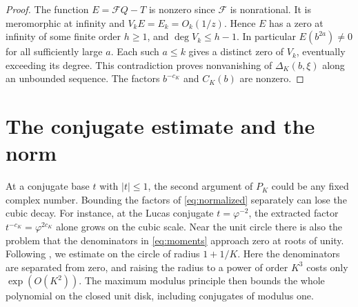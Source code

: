 \documentclass[11pt,letterpaper]{article}
\newcommand{\FF}{\mathcal F}
\begin{document}
\begin{proof}
The function \(E=\FF Q-T\) is nonzero since \(\FF\) is nonrational.
It is meromorphic at infinity and \(V_k E=E_k=O_k(1/z)\). Hence \(E\)
has a zero at infinity of some finite order \(h\ge1\), and
\(\deg V_k\le h-1\). In particular \(E(b^{2a})\ne0\) for all
sufficiently large \(a\). Each such \(a\le k\) gives a distinct zero
of \(V_k\), eventually exceeding its degree. This contradiction proves
nonvanishing of \(\Delta_K(b,\xi)\) along an unbounded sequence.
The factors \(b^{-c_K}\) and \(C_K(b)\) are nonzero.
\end{proof}

\newpage
\section{The conjugate estimate and the norm}\label{sec:norm}
At a conjugate base \(t\) with \(|t|\le1\), the second argument of
\(P_K\) could be any fixed complex number. Bounding the factors of
\eqref{eq:normalized} separately can lose the cubic decay. For instance,
at the Lucas conjugate \(t=\varphi^{-2}\), the extracted factor
\(t^{-c_K}=\varphi^{2c_K}\) alone grows on the cubic scale.
Near the unit circle there is also the problem that the denominators in
\eqref{eq:moments} approach zero at roots of unity. Following
\cite[\S4]{weight3}, we estimate on the circle of radius \(1+1/K\).
Here the denominators are separated from zero, and raising the radius
to a power of order \(K^3\) costs only \(\exp(O(K^2))\).
The maximum modulus principle then bounds the whole polynomial on the
closed unit disk, including conjugates of modulus one.
\end{document}
